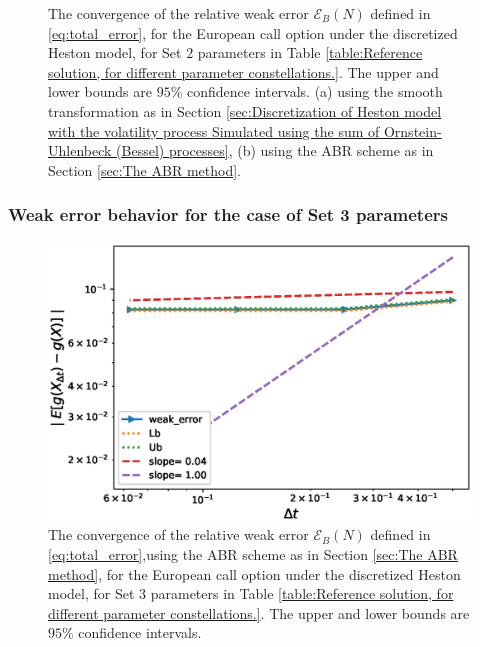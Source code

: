 \begin{figure}[htb]
\begin{subfigure}{0.4\textwidth}
		\caption{}
		\label{fig:2}
	\end{subfigure}\hfil %
	\caption{The convergence of the relative weak error  $\mathcal{E}_B(N)$ defined in \ref{eq:total_error}, for the European call option  under the discretized  Heston model, for Set $2$ parameters in Table \ref{table:Reference solution, for different parameter constellations.}. The upper and lower bounds are $95\%$ confidence intervals. (a) using the smooth transformation as in Section \ref{sec:Discretization of Heston model with the volatility process Simulated using the sum of  Ornstein-Uhlenbeck (Bessel) processes}, (b) using the ABR scheme as in Section \ref{sec:The ABR method}.}
	\label{fig:weak convergence comparison set 2}	
\end{figure}
\FloatBarrier

\subsubsection*{Weak error behavior for the case of Set 3 parameters}


\FloatBarrier
\begin{figure}[htb]
	\centering %
		\includegraphics[width=0.5\linewidth]{./figures/Heston_single_call_ABR_moment_matching/weak_convergence/weak_convergence_order_single_call_option_heston_relative_M_1_10_7_beta_128_ABR_set3}
	\caption{The convergence of the relative weak error  $\mathcal{E}_B(N)$ defined in \ref{eq:total_error},using the ABR scheme as in Section \ref{sec:The ABR method}, for the European call option  under the discretized  Heston model, for Set $3$ parameters in Table \ref{table:Reference solution, for different parameter constellations.}. The upper and lower bounds are $95\%$ confidence intervals.}
	\label{fig:weak convergence comparison set 3}	
\end{figure}
\FloatBarrier
